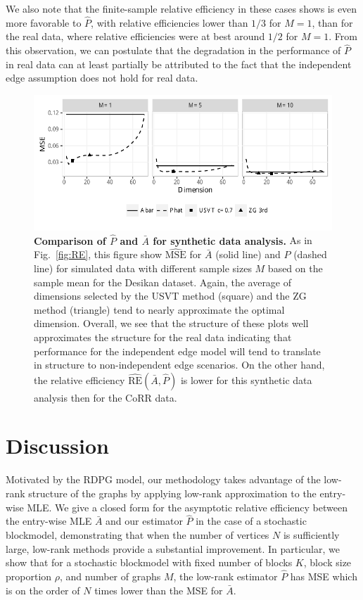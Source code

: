 \documentclass[10pt,letterpaper]{article}
\renewcommand{\hat}{\widehat}
\begin{document}
We also note that the finite-sample relative efficiency in these cases shows is even more favorable to $\hat{P}$, with relative efficiencies lower than $1/3$ for $M=1$, than for the real data, where relative efficiencies were at best around $1/2$ for $M=1$.
From this observation, we can postulate that the degradation in the performance of $\hat{P}$ in real data can at least partially be attributed to the fact that the independent edge assumption does not hold for real data.


\begin{figure}[!htb]
\centering
\includegraphics[width=1\textwidth]{sim_desikan.pdf}
\caption{{\bf Comparison of $\hat{P}$ and $\bar{A}$ for synthetic data analysis.}
As in Fig.~\ref{fig:RE}, this figure show $\hat{\mathrm{MSE}}$ for $\bar{A}$ (solid line) and $\hat{P}$ (dashed line) for simulated data with different sample sizes $M$ based on the sample mean for the Desikan dataset. Again, the average of dimensions selected by the USVT method (square) and the ZG method (triangle) tend to nearly approximate the optimal dimension. 
Overall, we see that the structure of these plots well approximates the structure for the real data indicating that performance for the independent edge model will tend to translate in structure to non-independent edge scenarios. 
On the other hand, the relative efficiency $\hat{\mathrm{RE}}(\bar{A},\hat{P})$ is lower for this synthetic data analysis then for the CoRR data.}
\label{fig:sim_desikan}
\end{figure}



\section{Discussion}\label{sec:discussion}

Motivated by the RDPG model, our methodology takes advantage of the low-rank structure of the graphs by applying low-rank approximation to the entry-wise MLE. 
We give a closed form for the asymptotic relative efficiency between the entry-wise MLE $\bar{A}$ and our estimator $\hat{P}$ in the case of a stochastic blockmodel, demonstrating that when the number of vertices $N$ is sufficiently large, low-rank methods provide a substantial improvement.
In particular, we show that for a stochastic blockmodel with fixed number of blocks $K$, block size proportion $\rho$, and number of graphs $M$, the low-rank estimator $\hat{P}$ has MSE which is on the order of $N$ times lower than the MSE for $\bar{A}$.
\end{document}
